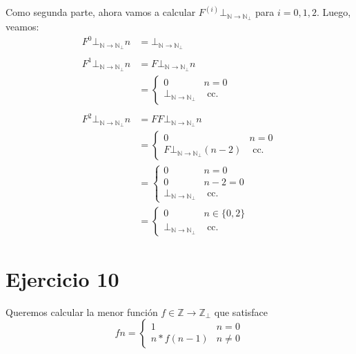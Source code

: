 \documentclass{article}
\newcommand{\N}{\mathbb{N}}
\newcommand{\Z}{\mathbb{Z}}
\begin{document}
Como segunda parte, ahora vamos a calcular $F^{(i)} \bot_{\N \to \N_\bot}$ para $i = 0, 1, 2$.
Luego, veamos:
\begin{equation*}
	\begin{aligned}
		F^0 \bot_{\N \to \N_\bot} n & = \bot_{\N \to \N_\bot}                        \\
		\\
		F^1 \bot_{\N \to \N_\bot} n & = F \bot_{\N \to \N_\bot} n                    \\
		                            & = \begin{cases}
			                                0                     & n = 0        \\
			                                \bot_{\N \to \N_\bot} & \text{ cc. }
		                                \end{cases}         \\
		\\
		F^2 \bot_{\N \to \N_\bot} n & = F F \bot_{\N \to \N_\bot} n                  \\
		                            & = \begin{cases}
			                                0                             & n = 0        \\
			                                F \bot_{\N \to \N_\bot} (n-2) & \text{ cc. }
		                                \end{cases} \\
		                            & = \begin{cases}
			                                0                     & n = 0        \\
			                                0                     & n-2 = 0      \\
			                                \bot_{\N \to \N_\bot} & \text{ cc. }
		                                \end{cases}         \\
		                            & =\begin{cases}
			                               0                     & n \in \{0, 2\} \\
			                               \bot_{\N \to \N_\bot} & \text{ cc. }
		                               \end{cases}
	\end{aligned}
\end{equation*}

\section*{Ejercicio 10}
Queremos calcular la menor función $f \in \Z \to \Z_\bot$ que satisface
\begin{equation*}
	f n = \begin{cases}
		1            & n = 0    \\
		n * f(n - 1) & n \neq 0
	\end{cases}
\end{equation*}
\end{document}
